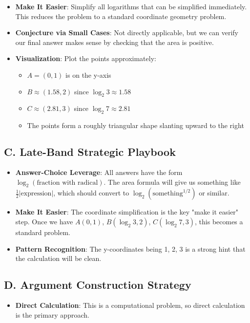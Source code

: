\documentclass[12pt]{article}
\begin{document}
\begin{strategicbox}
\begin{itemize}[leftmargin=*]
    \item \textbf{Make It Easier}: Simplify all logarithms that can be simplified immediately. This reduces the problem to a standard coordinate geometry problem.
    
    \item \textbf{Conjecture via Small Cases}: Not directly applicable, but we can verify our final answer makes sense by checking that the area is positive.
    
    \item \textbf{Visualization}: Plot the points approximately:
    \begin{itemize}
        \item $A = (0, 1)$ is on the y-axis
        \item $B \approx (1.58, 2)$ since $\log_2 3 \approx 1.58$
        \item $C \approx (2.81, 3)$ since $\log_2 7 \approx 2.81$
        \item The points form a roughly triangular shape slanting upward to the right
    \end{itemize}
\end{itemize}

\subsection*{C. Late-Band Strategic Playbook}
\begin{itemize}[leftmargin=*]
    \item \textbf{Answer-Choice Leverage}: All answers have the form $\log_2(\text{fraction with radical})$. The area formula will give us something like $\frac{1}{2}|\text{expression}|$, which should convert to $\log_2(\text{something}^{1/2})$ or similar.
    
    \item \textbf{Make It Easier}: The coordinate simplification is the key "make it easier" step. Once we have $A(0,1)$, $B(\log_2 3, 2)$, $C(\log_2 7, 3)$, this becomes a standard problem.
    
    \item \textbf{Pattern Recognition}: The y-coordinates being 1, 2, 3 is a strong hint that the calculation will be clean.
\end{itemize}

\subsection*{D. Argument Construction Strategy}
\begin{itemize}[leftmargin=*]
    \item \textbf{Direct Calculation}: This is a computational problem, so direct calculation is the primary approach.
    

\end{itemize}
\end{strategicbox}
\end{document}
